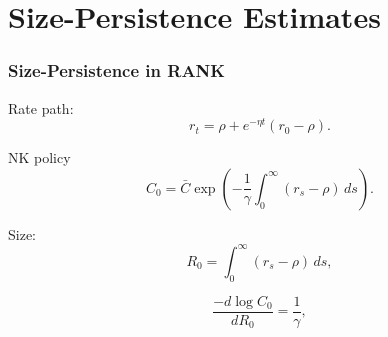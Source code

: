 \documentclass[10pt,aspectratio=169]{beamer}
\begin{document}
\section{Size-Persistence Estimates}

\begin{frame}\frametitle{Size-Persistence in RANK}
    Rate path:
        \begin{equation*}
            r_t=\rho+e^{-\eta t}(r_0-\rho).\label{eq:InterestRatePath}
        \end{equation*}
    
    NK policy    
    \[C_0=\bar C\exp\left(-\frac{1}{\gamma}\int_0^\infty \left(r_s-\rho\right)\,ds\right).\]
    
    Size:
    \begin{equation*}
        R_0=\int_0^\infty \left(r_s-\rho\right)\,ds,\label{eq:KMVsize}
    \end{equation*}
    
    
    \[\frac{-d \log C_0}{dR_0}=\frac{1}{\gamma},\]
    
    
    \end{frame}
    
    


    
        
\end{document}
